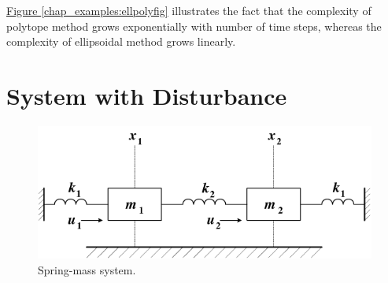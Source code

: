 \documentclass[letterpaper,10pt,english]{sphinxmanual}
\begin{document}
\hyperref[chap_examples:ellpolyfig]{Figure  \ref*{chap_examples:ellpolyfig}} illustrates the fact that the complexity of polytope
method grows exponentially with number of time steps, whereas the
complexity of ellipsoidal method grows linearly.


\section{System with Disturbance}
\label{chap_examples:system-with-disturbance}\begin{figure}[htbp]
\centering
\capstart

\includegraphics[width=0.300\linewidth]{chapter06_section02_springmass.png}
\caption{Spring-mass system.}\label{chap_examples:springmassfig}\end{figure}
\end{document}
